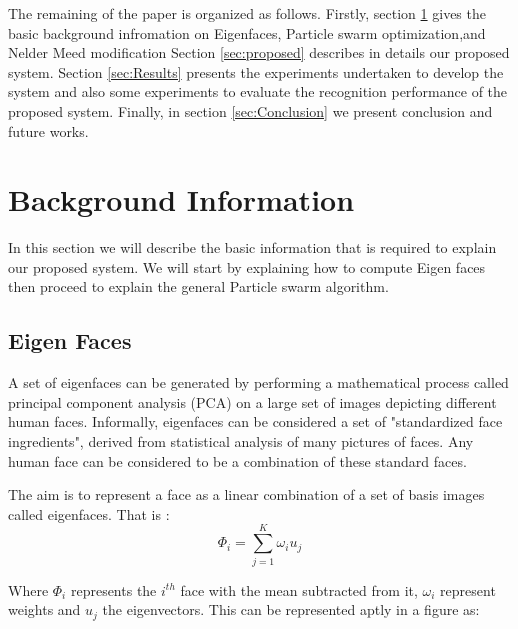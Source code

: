 \documentclass[a4paper,twoside]{article}
\begin{document}
The remaining of the paper is organized as follows. Firstly, section \ref{sec:section2} gives the basic background infromation on  Eigenfaces, Particle swarm optimization,and Nelder Meed modification Section \ref{sec:proposed} describes in details our proposed system. Section \ref{sec:Results} presents the experiments undertaken to develop the system and also some experiments to evaluate the recognition performance of the proposed system. Finally, in section \ref{sec:Conclusion} we present conclusion and future works.



\section{Background Information}
\label{sec:section2}
In this section we will describe the basic information that is required to
explain our proposed system.  We will start by explaining how to compute Eigen
faces then proceed to explain the general Particle swarm algorithm.

\subsection{Eigen Faces}
\label{facereg}
A set of eigenfaces \cite{facesite} can be generated by performing a mathematical process called principal component analysis (PCA) on a large set of images depicting different human faces. Informally, eigenfaces can be considered a set of "standardized face ingredients", derived from statistical analysis of many pictures of faces. Any human face can be considered to be a combination of these standard faces.


 The aim is to represent a face as a linear combination of a set of basis images called eigenfaces. That is :
\begin{equation}
\Phi _i  = \sum\limits_{j = 1}^K {\omega _i u_j }
\end{equation}

Where $\Phi_i$ represents the $i^{th}$ face with the mean subtracted from it, $\omega _i$ represent weights and  $u_j$ the eigenvectors.
This can be represented aptly in a figure as:
\end{document}
